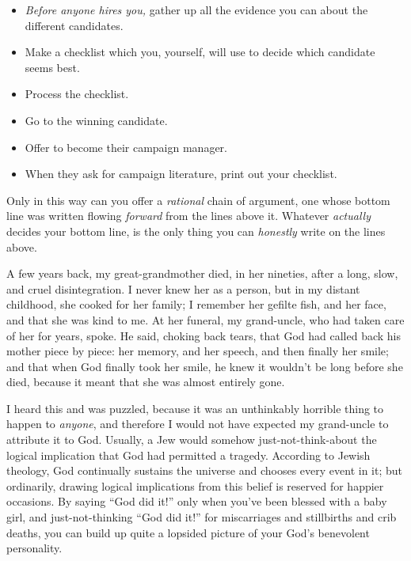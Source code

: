 \begin{itemize}
\item {
 \textit{Before anyone hires you,} gather up all the evidence you
can about the different candidates.}

\item {
 Make a checklist which you, yourself, will use to decide which
candidate seems best.}

\item {
 Process the checklist.}

\item {
 Go to the winning candidate.}

\item {
 Offer to become their campaign manager.}

\item {
  When they ask for campaign literature, print out your checklist.}
\end{itemize}

{
 Only in this way can you offer a \textit{rational} chain of
argument, one whose bottom line was written flowing \textit{forward}
from the lines above it. Whatever \textit{actually} decides your bottom
line, is the only thing you can \textit{honestly} write on the lines
above.}

\myendsectiontext


{
 A few years back, my great-grandmother died, in her nineties,
after a long, slow, and cruel disintegration. I never knew her as a
person, but in my distant childhood, she cooked for her family; I
remember her gefilte fish, and her face, and that she was kind to me.
At her funeral, my grand-uncle, who had taken care of her for years,
spoke. He said, choking back tears, that God had called back his mother
piece by piece: her memory, and her speech, and then finally her smile;
and that when God finally took her smile, he knew it
wouldn't be long before she died, because it meant that
she was almost entirely gone. }

{
 I heard this and was puzzled, because it was an unthinkably
horrible thing to happen to \textit{anyone}, and therefore I would not
have expected my grand-uncle to attribute it to God. Usually, a Jew
would somehow just-not-think-about the logical implication that God had
permitted a tragedy. According to Jewish theology, God continually
sustains the universe and chooses every event in it; but ordinarily,
drawing logical implications from this belief is reserved for happier
occasions. By saying ``God did it!''
only when you've been blessed with a baby girl, and
just-not-thinking ``God did it!''
for miscarriages and stillbirths and crib deaths, you can build up
quite a lopsided picture of your God's benevolent
personality.}

